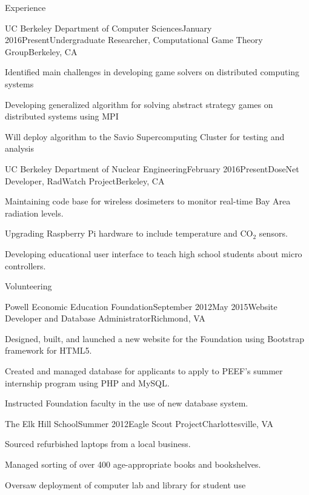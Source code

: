 \documentclass{resume} %
\begin{document}
\begin{rSection}{Experience}
\begin{rSubsection}{UC Berkeley Department of Computer Sciences}{January 2016\textminus Present}{Undergraduate Researcher, Computational Game Theory Group}{Berkeley, CA}
\item Identified main challenges in developing game solvers on distributed computing systems
\item Developing generalized algorithm for solving abstract strategy games on distributed systems using MPI
\item Will deploy algorithm to the Savio Supercomputing Cluster for testing and analysis
\end{rSubsection}
\begin{rSubsection}{UC Berkeley Department of Nuclear Engineering}{February 2016\textminus Present}{DoseNet Developer, RadWatch Project}{Berkeley, CA}
\item Maintaining code base for wireless dosimeters to monitor real-time Bay Area radiation levels.
\item Upgrading Raspberry Pi hardware to include temperature and CO$_2$ sensors. 
\item Developing educational user interface to teach high school students about micro controllers.
\end{rSubsection}
\end{rSection}


\begin{rSection}{Volunteering}

\begin{rSubsection}{Powell Economic Education Foundation}{September 2012\textminus May 2015}{Website Developer and Database Administrator}{Richmond, VA}
\item Designed, built, and launched a new website for the Foundation using Bootstrap framework for HTML5.
\item Created and managed database for applicants to apply to PEEF's summer internship program using PHP and MySQL.
\item Instructed Foundation faculty in the use of new database system.
\end{rSubsection}
\begin{rSubsection}{The Elk Hill School}{Summer 2012}{Eagle Scout Project}{Charlottesville, VA}
\item Sourced refurbished laptops from a local business.
\item Managed sorting of over 400 age-appropriate books and bookshelves.
\item Oversaw deployment of computer lab and library for student use
\end{rSubsection}
\end{rSection}
\end{document}
